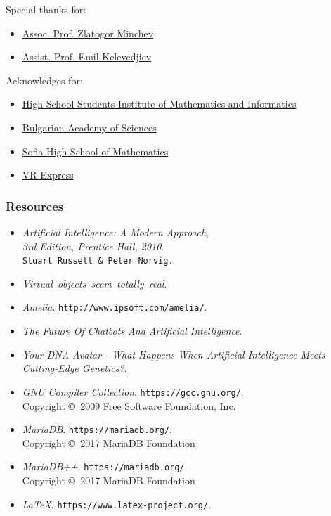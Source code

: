\documentclass[12pt]{beamer}
\begin{document}
	\begin{frame}
		Special thanks for:
		\begin{itemize}
			\item \href{https://bg.linkedin.com/in/zlatogor-minchev-a101b85}{Assoc. Prof. Zlatogor Minchev} \\
			\item \href{https://bg.linkedin.com/in/emil-kelevedjiev-34727310b}{Assist. Prof. Emil Kelevedjiev} \\\par
		\end{itemize}
		\vspace{0.5cm}
		Acknowledges for:
		\begin{itemize}
			\item \href{http://www.math.bas.bg/omi/hssimi/}{High School Students Institute of Mathematics and Informatics}
			\item \href{http://www.math.bas.bg/}{Bulgarian Academy of Sciences}
			\item \href{http://www.smg.bg}{Sofia High School of Mathematics}
			\item \href{https://www.vrexpress.bg/}{VR Express}
		\end{itemize}
	\end{frame}
	
	\begin{frame}
	\frametitle{Resources}
		\begin{itemize}
			\item
			{\itshape Artificial Intelligence: A Modern Approach, \\ 3rd Edition, Prentice Hall, 2010}. \\
			\texttt{Stuart Russell \& Peter Norvig.} \\
			\item
			{\itshape Virtual\ objects\ seem\ totally\ real}.
			\\
			\item
			{\itshape Amelia}.
			\texttt{http://www.ipsoft.com/amelia/}. \\
			\item
			{\itshape The Future Of Chatbots And Artificial Intelligence}.
			\item
			{\itshape Your DNA Avatar - What Happens When Artificial Intelligence Meets Cutting-Edge Genetics?}.
			\item%
			{\itshape GNU Compiler Collection}.
			\texttt{https://gcc.gnu.org/}. \\
			Copyright \copyright\  2009 Free Software Foundation, Inc.
			\item%
			{\itshape MariaDB}.
			\texttt{https://mariadb.org/}. \\
			Copyright \copyright\  2017 MariaDB Foundation
			\item%
			{\itshape MariaDB++}.
			\texttt{https://mariadb.org/}. \\
			Copyright \copyright\  2017 MariaDB Foundation
			\item%
			{\itshape \LaTeX}.
			\texttt{https://www.latex-project.org/}.
		\end{itemize}
	\end{frame}
	
\end{document}
